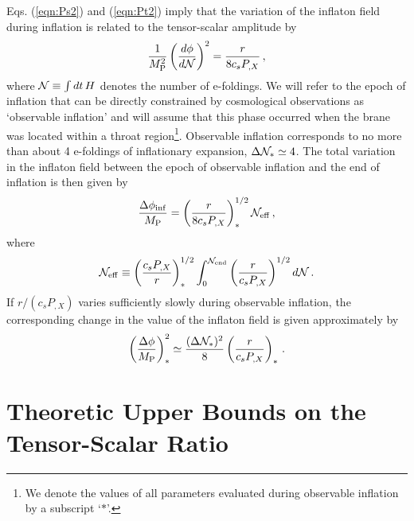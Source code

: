 Eqs. (\ref{eqn:Ps2}) and (\ref{eqn:Pt2}) imply 
that the variation of the inflaton field during inflation  
is related to the tensor-scalar amplitude by \cite{lyth,bmpaper}
\begin{equation}
\label{genlythbound}
\frac{1}{M_{\rm P}^2}
\left( \frac{d \phi}{d \cal{N}} \right)^2 = \frac{r}{8 c_s P_{,X}} \,,
\end{equation}
where ${\cal{N}} \equiv \int dt \, H$ denotes the number of e-foldings.
We will refer to the epoch of inflation that can be directly 
constrained by cosmological observations as 
`observable inflation' and will assume that this phase 
occurred when the brane was located within a 
throat region\footnote{We denote the values of all parameters 
evaluated during observable inflation by a subscript 
`$*$'.}. Observable inflation corresponds to no more than about 4 e-foldings  
of inflationary expansion, $\Delta {\cal{N}}_* \simeq 4$. 
The total variation in the inflaton field between the epoch of observable 
inflation and the end of inflation is then given by
\begin{equation}
\label{totalfield}
\frac{\Delta \phi_{\rm inf}}{M_{\rm P}} = 
\left( \frac{r}{8c_sP_{,X}} \right)_*^{1/2} {\cal{N}}_{\rm eff} \,,
\end{equation}
where
\begin{equation}
\label{Neff}
{\cal{N}}_{\rm eff} \equiv \left( \frac{c_sP_{,X}}{r}\right)_*^{1/2}
\int_0^{{\cal{N}}_{\rm end}}  
\left( \frac{r}{c_sP_{,X}} \right)^{1/2} d {\cal{N}} \,.
\end{equation}
If $r/(c_s P_{,X})$ varies 
sufficiently slowly during observable inflation, 
the corresponding change in the value of the inflaton  
field is given approximately by \cite{lyth,bmpaper}
\begin{equation}
\label{approxlyth}
\left( \frac{\Delta \phi}{M_{\rm P}} \right)_*^2 \simeq 
\frac{(\Delta {\cal{N}}_*)^2}{8} \left( \frac{r}{c_sP_{,X}} \right)_* \,.
\end{equation}

\section{Theoretic Upper Bounds on the Tensor-Scalar Ratio}
\label{sec:theobound}

